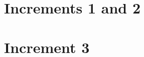 \documentclass[12pt,twoside,a4paper]{book}
\begin{document}
\cleardoublepage
\chapter{Increments 1 and 2}


\cleardoublepage
\chapter{Increment 3}


%



\appendix
\cleardoublepage


%

%

\cleardoublepage


%

\cleardoublepage

\end{document}
